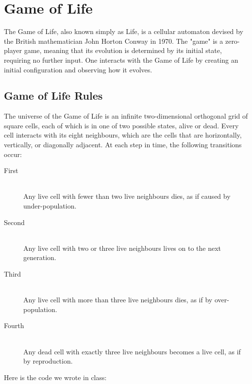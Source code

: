 
\section {Game of Life}

The Game of Life, also known simply as Life, is a cellular automaton devised by the British mathematician John Horton Conway in 1970.
The "game" is a zero-player game, meaning that its evolution is determined by its initial state, requiring no further input. One interacts with the Game of Life by creating an initial configuration and observing how it evolves.
\subsection{ Game of Life Rules}
The universe of the Game of Life is an infinite two-dimensional orthogonal grid of square cells, each of which is in one of two possible states, alive or dead. Every cell interacts with its eight neighbours, which are the cells that are horizontally, vertically, or diagonally adjacent. At each step in time, the following transitions occur:
\begin{description}
  \item[First] \hfill \\
  Any live cell with fewer than two live neighbours dies, as if caused by under-population.
  \item[Second] \hfill \\
  Any live cell with two or three live neighbours lives on to the next generation.
  \item[Third] \hfill \\
  Any live cell with more than three live neighbours dies, as if by over-population.
  \item[Fourth] \hfill \\
  Any dead cell with exactly three live neighbours becomes a live cell, as if by reproduction.
  
\end{description}
 Here is the code we wrote in class: \hfill
